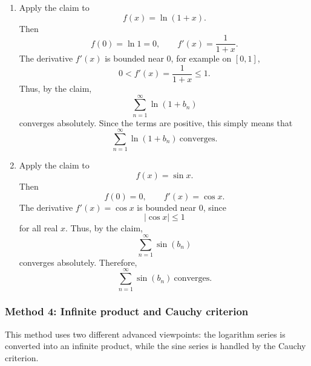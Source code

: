 \documentclass[12pt]{article}
\begin{document}
\begin{enumerate}[label=(\roman*)]
\item Apply the claim to
\[
f(x)=\ln(1+x).
\]
Then
\[
f(0)=\ln 1=0,
\qquad
f'(x)=\frac{1}{1+x}.
\]
The derivative \(f'(x)\) is bounded near \(0\), for example on \([0,1]\),
\[
0<f'(x)=\frac1{1+x}\le 1.
\]
Thus, by the claim,
\[
\sum_{n=1}^{\infty}\ln(1+b_n)
\]
converges absolutely. Since the terms are positive, this simply means that
\[
\boxed{\sum_{n=1}^{\infty}\ln(1+b_n)\ \text{converges}.}
\]

\item Apply the claim to
\[
f(x)=\sin x.
\]
Then
\[
f(0)=0,
\qquad
f'(x)=\cos x.
\]
The derivative \(f'(x)=\cos x\) is bounded near \(0\), since
\[
|\cos x|\le 1
\]
for all real \(x\). Thus, by the claim,
\[
\sum_{n=1}^{\infty}\sin(b_n)
\]
converges absolutely. Therefore,
\[
\boxed{\sum_{n=1}^{\infty}\sin(b_n)\ \text{converges}.}
\]
\end{enumerate}


\newpage
\subsubsection*{Method 4: Infinite product and Cauchy criterion}
This method uses two different advanced viewpoints: the logarithm series is converted into an infinite product, while the sine series is handled by the Cauchy criterion.
\end{document}
